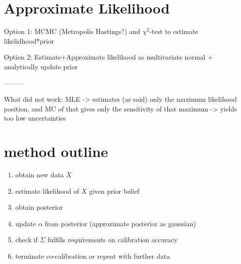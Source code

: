 \documentclass[10pt]{article}
\begin{document}
    \section{Approximate Likelihood}
    Option 1: MCMC (Metropolis Hastings?) and $\chi^2$-test to estimate likelidhood*prior
    
    Option 2: Estimate+Approximate likelihood as multivariate normal + analytically update prior
    
    ---------
    
    What did not work:
    MLE -> estimates (as said) only the maximum likelihood position, and MC of that gives only the sensitivity of that maximum -> yields too low uncertainties
    
    \section{method outline}
    \begin{enumerate}
        \item obtain new data $X$
        \item estimate likelihood of $X$ given prior belief
        \item obtain posterior
        \item update $\alpha$ from posterior (approximate posterior as gaussian)
        \item check if $\Sigma$ fulfills requirements on calibration accuracy
        \item terminate co-calibration or repeat with further data
    \end{enumerate}
    
\end{document}
